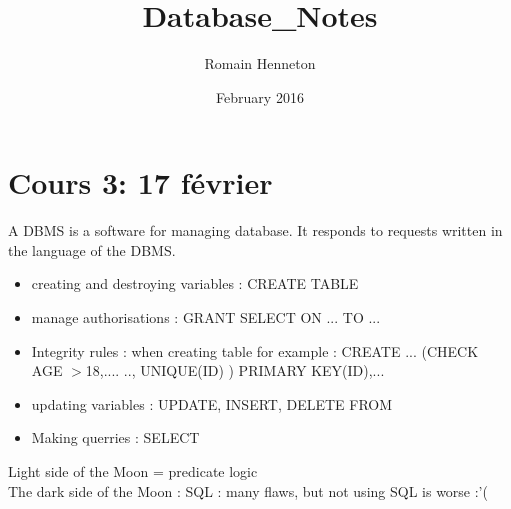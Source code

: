 \documentclass{article}
\title{Database_Notes}
\author{Romain Henneton}
\date{February 2016}
\begin{document}
\section{Cours 3: 17 février}
A DBMS is a software for managing database. It responds to requests written in the language of the DBMS.
\begin{itemize}

\item creating and destroying variables : CREATE TABLE
\item manage authorisations : GRANT SELECT ON ... TO ...
\item Integrity rules  : when creating table for example : CREATE ... (CHECK AGE $>$18,.... .., UNIQUE(ID) ) PRIMARY KEY(ID),...  
\item updating variables : UPDATE, INSERT, DELETE FROM
\item Making querries : SELECT
\end{itemize}

Light side of the Moon = predicate logic \\
The dark side of the Moon : SQL : many flaws, but not using SQL is worse :'(
\end{document}
